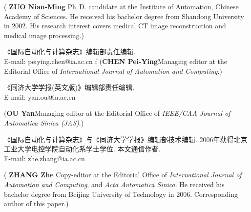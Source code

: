 \documentclass{Style/aas}
\begin{document}
\begin{multicols}{2}
\begin{biography}
\noindent({\bf
ZUO Nian-Ming
}\quad
Ph.\,D. candidate at the
Institute of Automation, Chinese Academy of Sciences. He received
his bachelor degree from Shandong University in 2002. His research
interest covers medical CT image reconstruction and medical image
processing.)
\end{biography}

\begin{biographynophoto}
\quad 《国际自动化与计算杂志》编辑部责任编辑.\\E-mail: peiying.chen@ia.ac.cn
ƒ
\noindent({\bf CHEN Pei-Ying}\quad Managing editor at the Editorial Office of
{\sl International Journal of Automation and Computing}.)
\end{biographynophoto}

\begin{biographynophoto}
\quad 《同济大学学报(英文版)》编辑部责任编辑.\\E-mail: yan.ou@ia.ac.cn

\noindent({\bf OU Yan}\quad Managing editor at the Editorial Office of
{\sl IEEE/CAA Journal of Automatica Sinica (JAS)}.)
\end{biographynophoto}

\begin{biography}
\quad
《国际自动化与计算杂志》与《同济大学学报》编辑部技术编辑. 2006年获得北京工业大学电控学院自动化系学士学位.
本文通信作者.\\E-mail: zhe.zhang@ia.ac.cn

\noindent({\bf
ZHANG Zhe
}\quad
Copy-editor at the Editorial Office of
{\sl International Journal of Automation and Computing}, and {\sl
Acta Automatica Sinica}. He received his bachelor degree from Beijing
University of Technology in 2006. Corresponding author of this paper.)
\end{biography}
\end{multicols}
\end{document}
